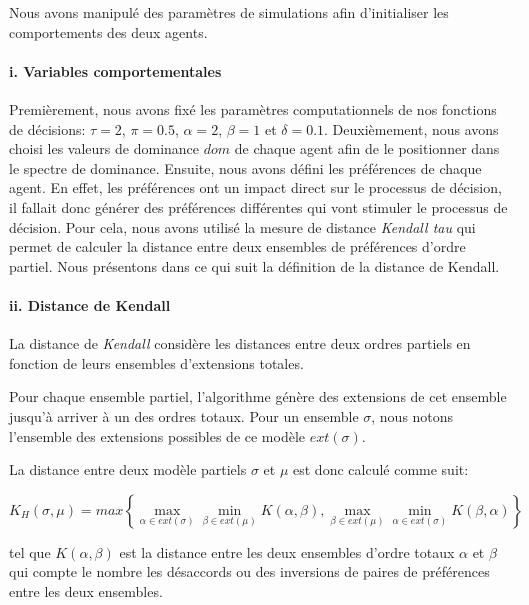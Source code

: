 				
				Nous avons manipulé des paramètres de simulations afin d'initialiser les comportements des deux agents.
				
				\paragraph{i. Variables comportementales}
				
				Premièrement, nous avons fixé les paramètres computationnels de nos fonctions de décisions: $\tau=2$, $\pi=0.5$, $\alpha=2$, $\beta=1$ et $\delta=0.1$. 
				Deuxièmement, nous avons choisi les valeurs de dominance $dom$ de chaque agent afin de le positionner dans le spectre de dominance. 
				Ensuite, nous avons défini les préférences de chaque agent. En effet, les préférences ont un impact direct sur le processus de décision, il fallait donc générer des préférences différentes qui vont stimuler le processus de décision. Pour cela, nous avons utilisé la mesure de distance \emph{Kendall tau} \cite{bra2013Kendall} qui permet de calculer la distance entre deux ensembles de préférences d'ordre partiel. 
				Nous présentons dans ce qui suit la définition de la distance de Kendall. 
				
				\vspace{1 em}
				\paragraph{ii. Distance de Kendall}
				La distance de \emph{Kendall} considère les distances entre deux ordres partiels en fonction de leurs ensembles d'extensions totales.
				
				Pour chaque ensemble partiel, l'algorithme génère des extensions de cet ensemble jusqu'à arriver à un des ordres totaux. Pour un ensemble $\sigma$, nous notons l'ensemble des extensions possibles de ce modèle $ext(\sigma)$.
				
				La distance entre deux modèle partiels  $\sigma$ et $\mu$ est donc calculé comme suit: 

				
				\begin{equation*}
					K_H(\sigma,\mu) = max \left \{ \max\limits_{\alpha \in ext(\sigma)} \min\limits_{\beta \in ext(\mu)} K(\alpha , \beta), \max\limits_{\beta \in ext(\mu)} \min\limits_{\alpha \in ext(\sigma)} K(\beta, \alpha)  \right \}
				\end{equation*}
				
				tel que $K(\alpha , \beta)$ est la distance entre les deux ensembles d'ordre totaux $\alpha$ et $\beta$ qui compte le nombre les désaccords ou des inversions de paires de préférences entre les deux ensembles. 
				 
